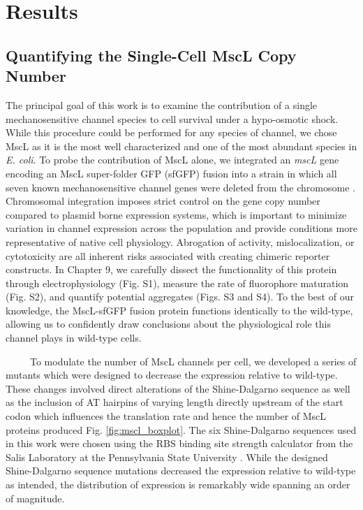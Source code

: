 \documentclass[12pt]{caltech_thesis}
\begin{document}
\hypertarget{results-3}{%
\section{Results}\label{results-3}}

\hypertarget{quantifying-the-single-cell-mscl-copy-number}{%
\subsection{Quantifying the Single-Cell MscL Copy
Number}\label{quantifying-the-single-cell-mscl-copy-number}}

The principal goal of this work is to examine the contribution of a
single mechanosensitive channel species to cell survival under a
hypo-osmotic shock. While this procedure could be performed for any
species of channel, we chose MscL as it is the most well characterized
and one of the most abundant species in \emph{E. coli}. To probe the
contribution of MscL alone, we integrated an \emph{mscL} gene encoding
an MscL super-folder GFP (sfGFP) fusion into a strain in which all seven
known mechanosensitive channel genes were deleted from the chromosome
\autocite{edwards2012}. Chromosomal integration imposes strict control
on the gene copy number compared to plasmid borne expression systems,
which is important to minimize variation in channel expression across
the population and provide conditions more representative of native cell
physiology. Abrogation of activity, mislocalization, or cytotoxicity are
all inherent risks associated with creating chimeric reporter
constructs. In Chapter 9, we carefully dissect the functionality of this
protein through electrophysiology (Fig. S1), measure the rate of
fluorophore maturation (Fig. S2), and quantify potential aggregates
(Figs. S3 and S4). To the best of our knowledge, the MscL-sfGFP fusion
protein functions identically to the wild-type, allowing us to
confidently draw conclusions about the physiological role this channel
plays in wild-type cells.

~~~~~To modulate the number of MscL channels per cell, we developed a
series of mutants which were designed to decrease the expression
relative to wild-type. These changes involved direct alterations of the
Shine-Dalgarno sequence as well as the inclusion of AT hairpins of
varying length directly upstream of the start codon which influences the
translation rate and hence the number of MscL proteins produced Fig.
\ref{fig:mscl_boxplot}. The six Shine-Dalgarno sequences used in this
work were chosen using the RBS binding site strength calculator from the
Salis Laboratory at the Pennsylvania State University
\autocite{espahborujeni2014,salis2009a}. While the designed
Shine-Dalgarno sequence mutations decreased the expression relative to
wild-type as intended, the distribution of expression is remarkably wide
spanning an order of magnitude.
\end{document}
